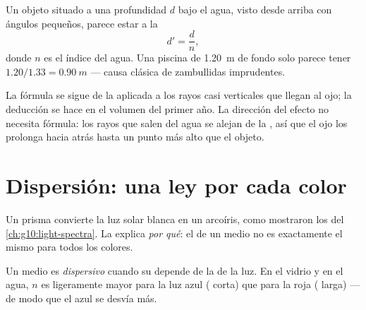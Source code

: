 \begin{proposition}\label{prop:g10:refraction:depth}
Un objeto situado a una profundidad $d$ bajo el agua, visto desde arriba
con ángulos pequeños, parece estar a la \emph{}
\[
d' = \frac{d}{n} ,
\]
donde $n$ es el índice del agua. Una piscina de \qty{1.20}{m} de fondo
solo parece tener $1.20/1.33 = \qty{0.90}{m}$ --- causa clásica de
zambullidas imprudentes.
\end{proposition}
\admitted

\begin{remark}\label{rem:g10:refraction:depthhonest}
La fórmula se sigue de la  aplicada a los rayos casi
verticales que llegan al ojo; la deducción se hace en el volumen del
primer año. La dirección del efecto no necesita fórmula: los rayos que
salen del agua se alejan de la , así que el ojo los prolonga hacia
atrás hasta un punto más alto que el objeto.
\end{remark}

\section{Dispersión: una ley por cada color}

Un prisma convierte la luz solar blanca en un arcoíris, como mostraron
los  del \cref{ch:g10:light-spectra}. La  explica
\emph{por qué}: el  de un medio no es exactamente el
mismo para todos los colores.

\begin{definition}[Dispersión]\label{def:g10:refraction:dispersion}
Un medio es \emph{dispersivo} cuando su  depende de la  de la luz. En el vidrio y en
el agua, $n$ es ligeramente mayor para la luz azul (
corta) que para la roja ( larga) --- de modo que el azul
se desvía más.
\end{definition}

